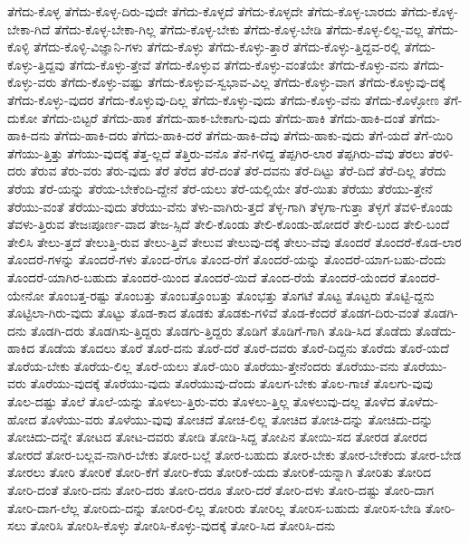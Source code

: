 {ತೆಗೆದು-ಕೊಳ್ಳ
ತೆಗೆದು-ಕೊಳ್ಳ-ದಿರು-ವುದೇ
ತೆಗೆದು-ಕೊಳ್ಳದೆ
ತೆಗೆದು-ಕೊಳ್ಳದೇ
ತೆಗೆದು-ಕೊಳ್ಳ-ಬಾರದು
ತೆಗೆದು-ಕೊಳ್ಳ-ಬೇಕಾ-ಗಿದೆ
ತೆಗೆದು-ಕೊಳ್ಳ-ಬೇಕಾ-ಗಿಲ್ಲ
ತೆಗೆದು-ಕೊಳ್ಳ-ಬೇಕು
ತೆಗೆದು-ಕೊಳ್ಳ-ಬೇಡಿ
ತೆಗೆದು-ಕೊಳ್ಳ-ಲಿಲ್ಲ-ವಲ್ಲ
ತೆಗೆದು-ಕೊಳ್ಳಿ
ತೆಗೆದು-ಕೊಳ್ಳಿ-ವಿಜ್ಞಾನಿ-ಗಳು
ತೆಗೆದು-ಕೊಳ್ಳು
ತೆಗೆದು-ಕೊಳ್ಳು-ತ್ತಾರೆ
ತೆಗೆದು-ಕೊಳ್ಳು-ತ್ತಿದ್ದವ-ರಲ್ಲಿ
ತೆಗೆದು-ಕೊಳ್ಳು-ತ್ತಿದ್ದವು
ತೆಗೆದು-ಕೊಳ್ಳು-ತ್ತೇವೆ
ತೆಗೆದು-ಕೊಳ್ಳುವ
ತೆಗೆದು-ಕೊಳ್ಳು-ವಂತೆಯೇ
ತೆಗೆದು-ಕೊಳ್ಳು-ವನು
ತೆಗೆದು-ಕೊಳ್ಳು-ವರು
ತೆಗೆದು-ಕೊಳ್ಳು-ವಷ್ಟು
ತೆಗೆದು-ಕೊಳ್ಳುವ-ಸ್ವಭಾವ-ವಿಲ್ಲ
ತೆಗೆದು-ಕೊಳ್ಳು-ವಾಗ
ತೆಗೆದು-ಕೊಳ್ಳುವು-ದಕ್ಕೆ
ತೆಗೆದು-ಕೊಳ್ಳು-ವುದರ
ತೆಗೆದು-ಕೊಳ್ಳುವು-ದಿಲ್ಲ
ತೆಗೆದು-ಕೊಳ್ಳು-ವುದು
ತೆಗೆದು-ಕೊಳ್ಳು-ವೆನು
ತೆಗೆದು-ಕೊಳ್ಳೋಣ
ತೆಗೆ-ದುಕೋ
ತೆಗೆದು-ಬಿಟ್ಟರೆ
ತೆಗೆದು-ಹಾಕ
ತೆಗೆದು-ಹಾಕ-ಬೇಕಾಗು-ವುದು
ತೆಗೆದು-ಹಾಕಿ
ತೆಗೆದು-ಹಾಕಿ-ದಂತೆ
ತೆಗೆದು-ಹಾಕಿ-ದನು
ತೆಗೆದು-ಹಾಕಿ-ದರು
ತೆಗೆದು-ಹಾಕಿ-ದರೆ
ತೆಗೆದು-ಹಾಕಿ-ದೆವು
ತೆಗೆದು-ಹಾಕು-ವುದು
ತೆಗೆ-ಯದೆ
ತೆಗೆ-ಯಿರಿ
ತೆಗೆಯು-ತ್ತಿತ್ತು
ತೆಗೆಯು-ವುದಕ್ಕೆ
ತೆತ್ತ-ಲ್ಲದೆ
ತೆತ್ತಿರು-ವನೊ
ತೆನೆ-ಗಳಿದ್ದ
ತೆಪ್ಪಗಿರ-ಲಾರ
ತೆಪ್ಪಗಿರು-ವೆವು
ತೆರಲು
ತೆರಳಿ-ದರು
ತೆರುವ
ತೆರು-ವರು
ತೆರು-ವುದು
ತೆರೆ
ತೆರೆದ
ತೆರೆ-ದಂತೆ
ತೆರೆ-ದವನು
ತೆರೆ-ದಿಟ್ಟು
ತೆರೆ-ದಿದೆ
ತೆರೆ-ದಿಲ್ಲ
ತೆರೆದು
ತೆರೆಯ
ತೆರೆ-ಯನ್ನು
ತೆರೆಯ-ಬೇಕೆಂದಿ-ದ್ದೇನೆ
ತೆರೆ-ಯಲು
ತೆರೆ-ಯಲ್ಲಿಯೇ
ತೆರೆ-ಯಿತು
ತೆರೆಯು
ತೆರೆಯು-ತ್ತೇನೆ
ತೆರೆಯು-ವಂತೆ
ತೆರೆಯು-ವುದು
ತೆರೆಯು-ವೆನು
ತೆಳು-ವಾಗಿರು-ತ್ತದೆ
ತೆಳ್ಳ-ಗಾಗಿ
ತೆಳ್ಳಗಾ-ಗುತ್ತಾ
ತೆಳ್ಳಗೆ
ತೆವಳಿ-ಕೊಂಡು
ತೆವಳು-ತ್ತಿರುವ
ತೇಜಃಪೂರ್ಣ-ವಾದ
ತೇಜ-ಸ್ಸಿದೆ
ತೇಲಿ-ಕೊಂಡು
ತೇಲಿ-ಕೊಂಡು-ಹೋದರೆ
ತೇಲಿ-ಬಂದ
ತೇಲಿ-ಬಂದೆ
ತೇಲಿಸಿ
ತೇಲು-ತ್ತದೆ
ತೇಲುತ್ತಿ-ರುವ
ತೇಲು-ತ್ತಿವೆ
ತೇಲುವ
ತೇಲುವು-ದಕ್ಕೆ
ತೇಲು-ವೆವು
ತೊಂದರೆ
ತೊಂದರೆ-ಕೊಡ-ಲಾರ
ತೊಂದರೆ-ಗಳನ್ನು
ತೊಂದರೆ-ಗಳು
ತೊಂದ-ರೆಗೂ
ತೊಂದ-ರೆಗೆ
ತೊಂದರೆ-ಯನ್ನು
ತೊಂದರೆ-ಯಾಗ-ಬಹು-ದೆಂದು
ತೊಂದರೆ-ಯಾಗಿರ-ಬಹುದು
ತೊಂದರೆ-ಯಿಂದ
ತೊಂದರೆ-ಯಿದೆ
ತೊಂದ-ರೆಯೆ
ತೊಂದರೆ-ಯೆಂದರೆ
ತೊಂದರೆ-ಯೇನೋ
ತೊಂಬತ್ತ-ರಷ್ಟು
ತೊಂಬತ್ತು
ತೊಂಬತ್ತೊಂಬತ್ತು
ತೊಂಭತ್ತು
ತೊಗಟೆ
ತೊಟ್ಟ
ತೊಟ್ಟರು
ತೊಟ್ಟಿ-ದ್ದನು
ತೊಟ್ಟಿಲಾ-ಗಿರು-ವುದು
ತೊಟ್ಟು
ತೊಡ-ಕಾದ
ತೊಡಕು
ತೊಡಕು-ಗಳಿವೆ
ತೊಡ-ಕೆಂದರೆ
ತೊಡಗ-ದಿರು-ವಂತೆ
ತೊಡಗಿ-ದನು
ತೊಡಗಿ-ದರು
ತೊಡಗಿಸು-ತ್ತಿದ್ದರು
ತೊಡಗು-ತ್ತಿದ್ದರು
ತೊಡಿಗೆ
ತೊಡಿಗೆ-ಗಾಗಿ
ತೊಡಿ-ಸಿದ
ತೊಡೆದು
ತೊಡೆದು-ಹಾಕಿದ
ತೊಡೆಯ
ತೊದಲು
ತೊರೆ
ತೊರೆ-ದನು
ತೊರೆ-ದರೆ
ತೊರೆ-ದವರು
ತೊರೆ-ದಿದ್ದನು
ತೊರೆದು
ತೊರೆ-ಯದೆ
ತೊರೆಯ-ಬೇಕು
ತೊರೆಯ-ಲಿಲ್ಲ
ತೊರೆ-ಯಲು
ತೊರೆ-ಯಿರಿ
ತೊರೆಯು-ತ್ತೇನೆಂದರು
ತೊರೆಯು-ವನು
ತೊರೆಯು-ವರು
ತೊರೆಯು-ವುದಕ್ಕೆ
ತೊರೆಯು-ವುದು
ತೊರೆಯುವು-ದೆಂದು
ತೊಲಗ-ಬೇಕು
ತೊಲ-ಗಾಚೆ
ತೊಲಗು-ವುವು
ತೊಲ-ದಷ್ಟು
ತೊಲೆ
ತೊಲೆ-ಯನ್ನು
ತೊಳಲು-ತ್ತಿರು-ವರು
ತೊಳಲು-ತ್ತಿಲ್ಲ
ತೊಳಲುವು-ದಲ್ಲ
ತೊಳೆದ
ತೊಳೆದು-ಹೋದ
ತೊಳೆಯು-ವರು
ತೊಳೆಯು-ವುವು
ತೋಚದೆ
ತೋಚ-ಲಿಲ್ಲ
ತೋಚಿದ
ತೋಚಿ-ದನ್ನು
ತೋಚಿದು-ದನ್ನು
ತೋಚಿದು-ದನ್ನೇ
ತೋಟದ
ತೋಟ-ದವರು
ತೋಡಿ
ತೋಡಿ-ಸಿದ್ದ
ತೋಪಿನ
ತೋಯಿ-ಸದ
ತೋರಡ
ತೋರದ
ತೋರದೆ
ತೋರ-ಬಲ್ಲವ-ನಾಗಿರ-ಬೇಕು
ತೋರ-ಬಲ್ಲೆ
ತೋರ-ಬಹುದು
ತೋರ-ಬೇಕು
ತೋರ-ಬೇಕೆಂದು
ತೋರ-ಬೇಡ
ತೋರಲು
ತೋರಿ
ತೋರಿಕೆ
ತೋರಿ-ಕೆಗೆ
ತೋರಿ-ಕೆಯ
ತೋರಿಕೆ-ಯದು
ತೋರಿಕೆ-ಯನ್ನಾಗಿ
ತೋರಿತು
ತೋರಿದ
ತೋರಿ-ದಂತೆ
ತೋರಿ-ದನು
ತೋರಿ-ದರು
ತೋರಿ-ದರೂ
ತೋರಿ-ದರೆ
ತೋರಿ-ದಳು
ತೋರಿ-ದಷ್ಟು
ತೋರಿ-ದಾಗ
ತೋರಿ-ದಾಗ-ಲೆಲ್ಲ
ತೋರಿದು-ದನ್ನು
ತೋರಿರ-ಲಿಲ್ಲ
ತೋರಿರು
ತೋರಿಲ್ಲ
ತೋರಿಸ-ಬಹುದು
ತೋರಿಸ-ಬೇಡಿ
ತೋರಿ-ಸಲು
ತೋರಿಸಿ
ತೋರಿಸಿ-ಕೊಳ್ಳು
ತೋರಿಸಿ-ಕೊಳ್ಳು-ವುದಕ್ಕೆ
ತೋರಿ-ಸಿದ
ತೋರಿಸಿ-ದನು
}
